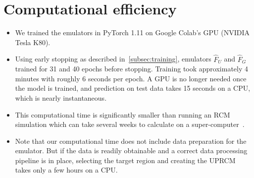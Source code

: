 \documentclass[a4paper,11pt,oneside]{report}
\begin{document}
\section{Computational efficiency}\label{sec:computational-efficiency}
\begin{itemize}
\item We trained the emulators in PyTorch 1.11 on Google Colab's GPU (NVIDIA Tesla K80).
    \item Using early stopping as described in~\autoref{subsec:training}, emulators $\hat{F}_U$ and $\hat{F}_G$ trained for 31 and 40 epochs before stopping. Training took approximately 4 minutes with roughly 6 seconds per epoch. A GPU is no longer needed once the model is trained, and prediction on test data takes 15 seconds on a CPU, which is nearly instantaneous. 
    \item This computational time is significantly smaller than running an RCM simulation which can take several weeks to calculate on a super-computer~\cite{Doury}. 
    \item Note that our computational time does not include data preparation for the emulator. But if the data is readily obtainable and a correct data processing pipeline is in place, selecting the target region and creating the UPRCM takes only a few hours on a CPU.   
\end{itemize}
\end{document}

